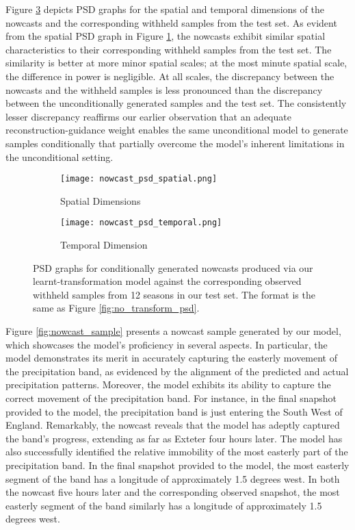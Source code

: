 \documentclass[ oneside,%
                    author={George Herbert},
                    degree={MSci},
                     title={Diffusion Models for Time-Evolving Precipitation Fields},
                  subtitle={}]{dissertation}
\begin{document}
Figure \ref{fig:nowcast_psd} depicts PSD graphs for the spatial and temporal dimensions of the nowcasts and the corresponding withheld samples from the test set. As evident from the spatial PSD graph in Figure \ref{fig:nowcast_psd_spatial}, the nowcasts exhibit similar spatial characteristics to their corresponding withheld samples from the test set. The similarity is better at more minor spatial scales; at the most minute spatial scale, the difference in power is negligible. At all scales, the discrepancy between the nowcasts and the withheld samples is less pronounced than the discrepancy between the unconditionally generated samples and the test set. The consistently lesser discrepancy reaffirms our earlier observation that an adequate reconstruction-guidance weight enables the same unconditional model to generate samples conditionally that partially overcome the model's inherent limitations in the unconditional setting. 

\begin{figure}[htbp]
      \centering
      \begin{subfigure}{.47\textwidth}
            \texttt{[image: nowcast\_psd\_spatial.png]}
            \caption{Spatial Dimensions}
            \label{fig:nowcast_psd_spatial}
      \end{subfigure}
      \begin{subfigure}{.51\textwidth}
            \texttt{[image: nowcast\_psd\_temporal.png]}
            \caption{Temporal Dimension}
            \label{fig:nowcast_psd_temporal}
      \end{subfigure}
      \caption{PSD graphs for conditionally generated nowcasts produced via our learnt-transformation model against the corresponding observed withheld samples from 12 seasons in our test set. The format is the same as Figure \ref{fig:no_transform_psd}.}
      \label{fig:nowcast_psd}
\end{figure}

Figure \ref{fig:nowcast_sample} presents a nowcast sample generated by our model, which showcases the model's proficiency in several aspects. In particular, the model demonstrates its merit in accurately capturing the easterly movement of the precipitation band, as evidenced by the alignment of the predicted and actual precipitation patterns. Moreover, the model exhibits its ability to capture the correct movement of the precipitation band. For instance, in the final snapshot provided to the model, the precipitation band is just entering the South West of England. Remarkably, the nowcast reveals that the model has adeptly captured the band's progress, extending as far as Exteter four hours later. The model has also successfully identified the relative immobility of the most easterly part of the precipitation band. In the final snapshot provided to the model, the most easterly segment of the band has a longitude of approximately 1.5 degrees west. In both the nowcast five hours later and the corresponding observed snapshot, the most easterly segment of the band similarly has a longitude of approximately 1.5 degrees west.
\end{document}

